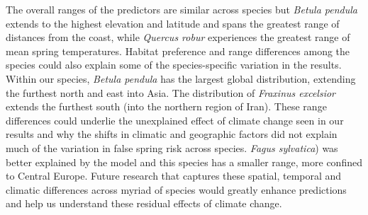 \documentclass{article}\usepackage[]{graphicx}\usepackage[]{color}
\begin{document}

The overall ranges of the predictors are similar across species but \textit{Betula pendula} extends to the highest elevation and latitude and spans the greatest range of distances from the coast, while \textit{Quercus robur} experiences the greatest range of mean spring temperatures. Habitat preference and range differences among the species could also explain some of the species-specific variation in the results. Within our species, \textit{Betula pendula} has the largest global distribution, extending the furthest north and east into Asia. The distribution of \textit{Fraxinus excelsior} extends the furthest south (into the northern region of Iran). These range differences could underlie the unexplained effect of climate change seen in our results and why the shifts in climatic and geographic factors did not explain much of the variation in false spring risk across species. \textit{Fagus sylvatica}) was better explained by the model and this species has a smaller range, more confined to Central Europe. Future research that captures these spatial, temporal and climatic differences across myriad of species would greatly enhance predictions and help us understand these residual effects of climate change. %
\end{document}
